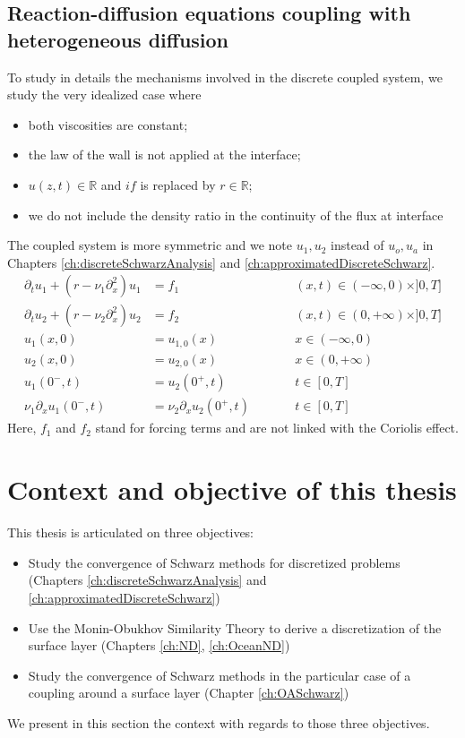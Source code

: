 \subsection{Reaction-diffusion equations coupling
with heterogeneous diffusion}
\label{sec:airseaSCM_reactionDiffusionSection}
To study in details the mechanisms involved in
the discrete coupled system, we study the very idealized
case where
\begin{itemize}
	\item both viscosities are constant;
	\item the law of the wall is not applied
		at the interface;
	\item $u(z,t) \in\mathbb{R}$ and $if$ is replaced by
		$r\in\mathbb{R}$;
	\item we do not include the density ratio
	in the continuity of the flux at interface
\end{itemize}
The coupled system is more symmetric and we note
$u_1, u_2$ instead of $u_o, u_a$ in Chapters
\ref{ch:discreteSchwarzAnalysis} and
\ref{ch:approximatedDiscreteSchwarz}.
\begin{subequations}
\begin{align}
\partial_t u_1 +( r - \nu_1 \partial_x^2) u_1 &= f_1  &\qquad& (x,t) \in (-\infty,0) \times ]0,T] \label{eq:dr1} \\
\partial_t u_2 + ( r - \nu_2 \partial_x^2) u_2  &= f_2  &\qquad& (x,t) \in (0,+\infty) \times ]0,T] \label{eq:dr2}\\
u_1(x,0) &= u_{1,0}(x)   &\qquad&  x \in (-\infty,0)  \\
u_2(x,0) &= u_{2,0}(x)   &\qquad&  x \in (0,+\infty) \\
u_1(0^-,t) &=  u_2(0^+,t) &\qquad& t \in [0,T] \label{eq:interface-dir} \\
\nu_1 \partial_x u_1(0^-,t) &= \nu_2 \partial_x u_2(0^+,t) &\qquad& t \in [0,T] \label{eq:interface-neu} 
\end{align}
\label{eq:model-problem}
\end{subequations}
Here, $f_1$ and $f_2$
stand for forcing terms and are not linked with the Coriolis effect.
\section{Context and objective of this thesis}
\label{sec:airseaSCM_context_objectives}
This thesis is articulated on three objectives:
\begin{itemize}
	\item Study the convergence of Schwarz methods
		for discretized problems (Chapters
		\ref{ch:discreteSchwarzAnalysis} and
		\ref{ch:approximatedDiscreteSchwarz})
	\item Use the Monin-Obukhov Similarity Theory
		to derive a discretization of the surface layer
		(Chapters \ref{ch:ND}, \ref{ch:OceanND})
	\item Study the convergence of Schwarz methods in the
		particular case of a coupling around a surface layer
		(Chapter \ref{ch:OASchwarz})
\end{itemize}
We present in this section the context with regards to those three
objectives.
